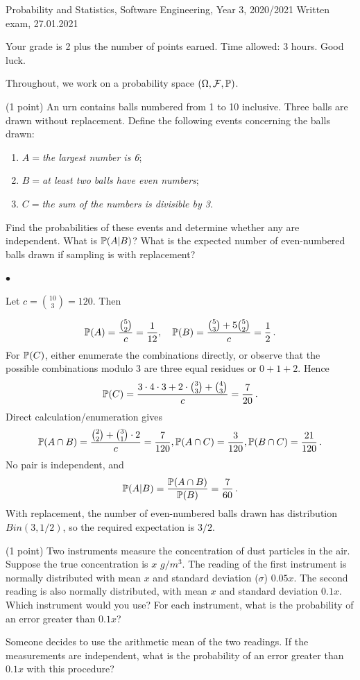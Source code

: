 \documentclass[a4paper]{report}
\begin{document}
\noindent Probability and Statistics, Software Engineering, Year 3, 2020/2021 \hfill Written exam, 27.01.2021

\hrulefill

\begin{it}
Your grade is 2 plus the number of points earned. Time allowed: 3 hours. Good luck.

Throughout, we work on a probability space $(\Omega, \cF, \P)$.
\end{it}

\begin{problem} (1 point)
An urn contains balls numbered from 1 to 10 inclusive.
Three balls are drawn without replacement. Define
the following events concerning the balls drawn:
\begin{enumerate}
    \item $A = $\textit{the largest number is 6};
    \item $B = $\textit{at least two balls have even numbers};
    \item $C = $\textit{the sum of the numbers is divisible by 3}.
    \end{enumerate}
\end{problem}
Find the probabilities of these events and
determine whether any are independent. What is $\P(A|B)$?
What is the expected number of even-numbered balls drawn
if sampling is with replacement?

$\bullet$

Let $c=\binom{10}{3}=120$. Then

\[ \P(A) = \frac{\binom{5}{2}}{c} = \frac{1}{12}, \quad \P(B) = \frac{\binom{5}{3} + 5\binom{5}{2}}{c} = \frac12 \, .
\]
For $\P(C)$, either enumerate the combinations directly,
or observe that the possible combinations modulo $3$ are
three equal residues or $0+1+2$. Hence
\[
\P(C) = \frac{3\cdot 4 \cdot 3 + 2 \cdot \binom{3}{3} + \binom{4}{3}}{c}
= \frac{7}{20}\, .
\]
Direct calculation/enumeration gives
\[
\P(A \cap B) = \frac{\binom{2}{2} + \binom{3}{1}\cdot 2}{c} = \frac{7}{120} , \P(A \cap C) = \frac{3}{120} , \P(B \cap C) = \frac{21}{120}\, .
\]
No pair is independent, and
\[\P(A|B) = \frac{\P(A \cap B)}{\P(B)} = \frac{7}{60} \, .\]
With replacement, the number of even-numbered balls drawn
has distribution $Bin(3,1/2)$, so the required expectation
is $3/2$.

\begin{problem}(1 point)
Two instruments measure the concentration of dust particles
in the air.
Suppose the true concentration is $x$ $g/m^3$.
The reading of the first instrument
is normally distributed with mean $x$ and standard deviation ($\sigma$) $0.05x$.
The second reading is also normally distributed,
with mean $x$ and standard deviation
$0.1x$. Which instrument would you use?
For each instrument, what is the probability of an error
greater than $0.1x$?

Someone decides to use the arithmetic mean of the two readings.
If the measurements are independent, what is the probability
of an error greater than $0.1x$ with this procedure?
\end{problem}
\end{document}
